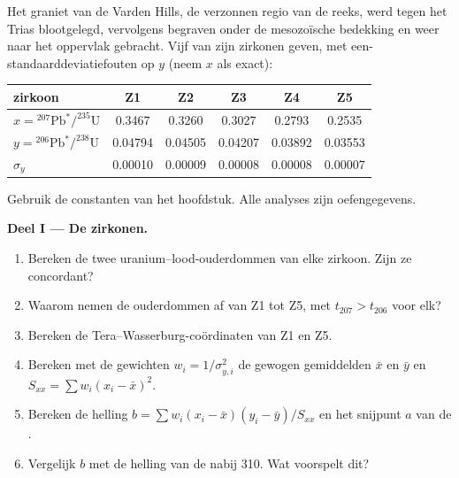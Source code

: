 \begin{problem}\label{pb:b3:advanced-geochronology:1}
Het graniet van de Varden Hills, de verzonnen regio van de reeks, werd tegen het Trias
blootgelegd, vervolgens begraven onder de mesozoïsche bedekking en weer naar het
oppervlak gebracht. Vijf van zijn zirkonen geven, met een-standaarddeviatiefouten op $y$
(neem $x$ als exact):
\begin{center}
\small
\begin{tabular}{|l|ccccc|}
\hline
zirkoon & Z1 & Z2 & Z3 & Z4 & Z5 \\
\hline
$x = {}^{207}\mathrm{Pb}^*/^{235}\mathrm U$ & 0.3467 & 0.3260 & 0.3027 & 0.2793 & 0.2535 \\
$y = {}^{206}\mathrm{Pb}^*/^{238}\mathrm U$ & 0.04794 & 0.04505 & 0.04207 & 0.03892 & 0.03553 \\
$\sigma_y$ & 0.00010 & 0.00009 & 0.00008 & 0.00008 & 0.00007 \\
\hline
\end{tabular}
\end{center}
Gebruik de constanten van het hoofdstuk. Alle analyses zijn oefengegevens.

\medskip\noindent\textbf{Deel I --- De zirkonen.}
\begin{enumerate}
\item Bereken de twee uranium--lood-ouderdommen van elke zirkoon. Zijn ze concordant?
\item Waarom nemen de ouderdommen af van Z1 tot Z5, met $t_{207} > t_{206}$
voor elk?
\item Bereken de Tera--Wasserburg-coördinaten van Z1 en Z5.
\item Bereken met de gewichten $w_i = 1/\sigma_{y,i}^2$ de gewogen gemiddelden
$\bar x$ en $\bar y$ en $S_{xx} = \sum w_i(x_i - \bar x)^2$.
\item Bereken de helling $b = \sum w_i(x_i - \bar x)(y_i - \bar y)/S_{xx}$ en
het snijpunt $a$ van de .
\item Vergelijk $b$ met de helling van de  nabij \qty{310}{\Ma}. Wat
voorspelt dit?
\end{enumerate}


\end{problem}
